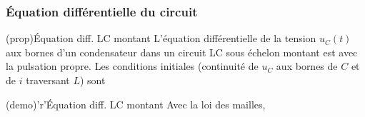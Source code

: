 \documentclass[../../main/main.tex]{subfiles}
\begin{document}
\subsubsection{Équation différentielle du circuit}
\begin{tcbraster}[raster columns=2, raster equal height=rows]
	\begin{tcb}[label=prop:eqdiffrc](prop){Équation diff. LC montant}
		L'équation différentielle de la tension $u_C(t)$ aux bornes d'un
		condensateur dans un circuit LC sous échelon montant est
		\psw{
			\[
				\boxed{\dv[2]{u_C}{t} + \w_0{}^2u_C = \w_0{}^{2}E}
			\]
		}
		avec  la pulsation propre.
		\tcblower
		Les conditions initiales (continuité de $u_C$ aux bornes de $C$
		et de $i$ traversant $L$) sont
	\end{tcb}
	\begin{tcb}[label=demo:eqdiffrc](demo)'r'{Équation diff. LC montant}
		Avec la loi des mailles,
	\end{tcb}
\end{tcbraster}
\end{document}
